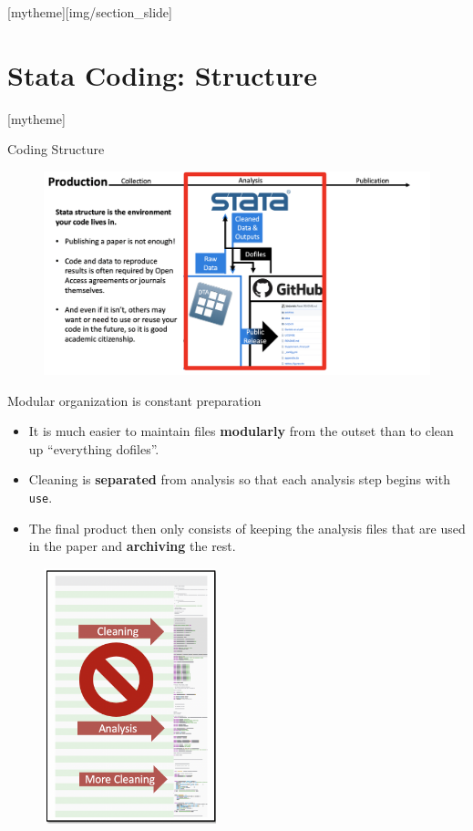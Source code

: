 \documentclass[aspectratio=169]{beamer}
\newcommand{\sectionpic}[2]{
	\setbeamertemplate{section page}[mytheme][#2]
	\section{#1}
	\setbeamertemplate{section page}[mytheme]
}
\begin{document}
\sectionpic{Stata Coding: Structure}{img/section_slide}

\begin{frame}{Coding Structure}
\begin{figure}
	\centering
	\includegraphics[width=\linewidth]{img/Production2}
\end{figure}
\end{frame}

\begin{frame}[fragile]{Modular organization is constant preparation}
\begin{multicols}{2}	
		
		\begin{itemize}[<default overlay specification>]
			\item<1> It is much easier to maintain files \textbf{modularly} from the outset than to clean up “everything dofiles”.
			\item<1>  Cleaning is \textbf{separated} from analysis so that each analysis step begins with \texttt{use}.
			\item<1>  The final product then only consists of keeping the analysis files that are used in the paper and \textbf{archiving} the rest.
		\end{itemize}
	
		\begin{figure}
			\centering
			\includegraphics[width=50mm]{img/Structure}
		\end{figure}
	
\end{multicols}
\end{frame}
\end{document}
